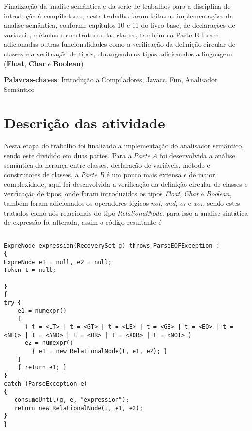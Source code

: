 \documentclass[
	article,			%
	11pt,				%
	oneside,			%
	a4paper,			%
	portuguese,			%
	brazil,				%
	sumario=tradicional
	]{abntex2}
\begin{document}
\frenchspacing 

\maketitle

\begin{resumoumacoluna}

Finalização da analise semântica e da serie de trabalhos para a disciplina de introdução à compiladores, neste trabalho foram feitas as implementações da analise semântica, conforme capítulos 10 e 11 do livro base, de declarações de variáveis,  métodos e construtores das classes, também na Parte B foram adicionadas outras funcionalidades como a verificação da definição circular de classes e a verificação de tipos, abrangendo os tipos adicionados a linguagem (\textbf{Float}, \textbf{Char} e \textbf{Boolean}).

 \vspace{\onelineskip}
 
 \noindent
 \textbf{Palavras-chaves}: Introdução a Compiladores, Javacc, Fun, Analisador Semântico
\end{resumoumacoluna}

\newpage
\tableofcontents*
\newpage
\textual
\section{Descrição das atividade}

Nesta etapa do trabalho foi finalizada a implementação do analisador semântico, sendo este dividido em duas partes. Para a \textit{Parte A} foi desenvolvida a análise semântica da herança entre classes, declaração de variáveis, método e construtores de classes, a \textit{Parte B} é um pouco mais extensa e de maior complexidade, aqui foi desenvolvida a verificação da definição circular de classes e verificação de tipos, onde foram introduzidos os tipos \textit{Float}, \textit{Char} e \textit{Boolean}, também foram adicionados os operadores lógicos \textit{not}, \textit{and}, \textit{or} e \textit{xor}, sendo estes tratados como nós relacionais do tipo \textit{RelationalNode}, para isso a analise sintática de expressão foi alterada, assim o código resultante é

\begin{lstlisting}

ExpreNode expression(RecoverySet g) throws ParseEOFException :
{
ExpreNode e1 = null, e2 = null;
Token t = null;

}
{
try {
    e1 = numexpr()
    [
      ( t = <LT> | t = <GT> | t = <LE> | t = <GE> | t = <EQ> | t = <NEQ> | t = <AND> | t = <OR> | t = <XOR> | t = <NOT> )
      e2 = numexpr()
        { e1 = new RelationalNode(t, e1, e2); }
    ]
    { return e1; }
}
catch (ParseException e)
{
   consumeUntil(g, e, "expression");
   return new RelationalNode(t, e1, e2);
}
}
\end{lstlisting}
\end{document}
